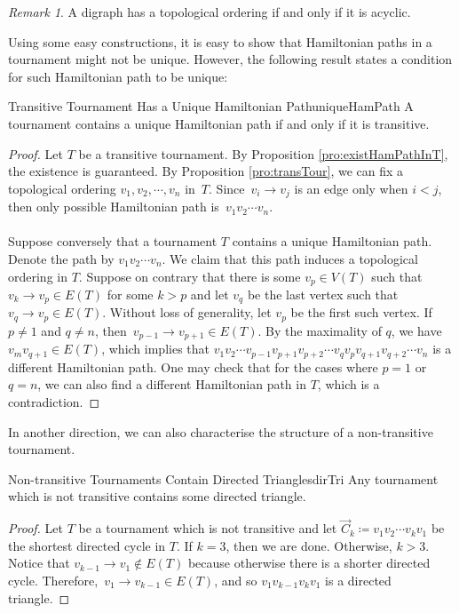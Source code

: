 \documentclass[math]{amznotes}
\theoremstyle{remark}
\newtheorem*{remark}{Remark}
\newcommand{\0}{\mathbf{0}}
\newcommand{\1}{\mathbf{1}}
\begin{document}
\begin{notebox}
    \begin{remark}
        A digraph has a topological ordering if and only if it is acyclic.
    \end{remark}
\end{notebox}
Using some easy constructions, it is easy to show that Hamiltonian paths in a tournament might not be unique. However, the following result states a condition for such Hamiltonian path to be unique:
\begin{probox}{Transitive Tournament Has a Unique Hamiltonian Path}{uniqueHamPath}
    A tournament contains a unique Hamiltonian path if and only if it is transitive.
    \tcblower
    \begin{proof}
        Let $T$ be a transitive tournament. By Proposition \ref{pro:existHamPathInT}, the existence is guaranteed. By Proposition \ref{pro:transTour}, we can fix a topological ordering $v_1, v_2, \cdots, v_n$ in~$T$. Since~$v_i \to v_j$ is an edge only when $i < j$, then only possible Hamiltonian path is~$v_1v_2\cdots v_n$.
        \\\\
        Suppose conversely that a tournament $T$ contains a unique Hamiltonian path. Denote the path by $v_1v_2\cdots v_n$. We claim that this path induces a topological ordering in $T$. Suppose on contrary that there is some $v_p \in V(T)$ such that $v_k \to v_p \in E(T)$ for some $k > p$ and let $v_q$ be the last vertex such that $v_q \to v_p \in E(T)$. Without loss of generality, let $v_p$ be the first such vertex. If $p \neq 1$ and $q \neq n$, then~$v_{p - 1} \to v_{p + 1} \in E(T)$. By the maximality of $q$, we have $v_mv_{q + 1} \in E(T)$, which implies that $v_1v_2\cdots v_{p - 1}v_{p + 1}v_{p + 2}\cdots v_qv_pv_{q + 1}v_{q + 2}\cdots v_n$ is a different Hamiltonian path. One may check that for the cases where $p = 1$ or $q = n$, we can also find a different Hamiltonian path in $T$, which is a contradiction.
    \end{proof}
\end{probox}
In another direction, we can also characterise the structure of a non-transitive tournament.
\begin{probox}{Non-transitive Tournaments Contain Directed Triangles}{dirTri}
    Any tournament which is not transitive contains some directed triangle.
    \tcblower
    \begin{proof}
        Let $T$ be a tournament which is not transitive and let $\overrightarrow{C}_k \coloneqq v_1v_2\cdots v_kv_1$ be the shortest directed cycle in $T$. If $k = 3$, then we are done. Otherwise, $k > 3$. Notice that $v_{k - 1} \to v_1 \notin E(T)$ because otherwise there is a shorter directed cycle. Therefore,~$v_1 \to v_{k - 1} \in E(T)$, and so $v_1v_{k - 1}v_kv_1$ is a directed triangle.
    \end{proof}
\end{probox}
\end{document}

